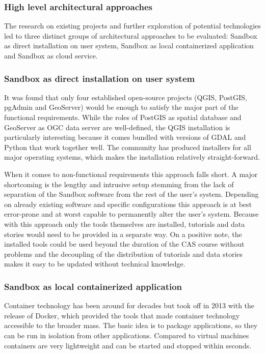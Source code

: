 \documentclass[11pt, a4paper, oneside, parskip=full-]{scrartcl}
\begin{document}
\subsubsection{High level architectural approaches}
The research on existing projects and further exploration of potential
technologies led to three distinct groups of architectural approaches to be
evaluated: Sandbox as direct installation on user system, Sandbox as local
containerized application and Sandbox as cloud service.

\subsubsection*{Sandbox as direct installation on user system}
It was found that only four established open-source projects (QGIS\cite{qgis},
PostGIS\cite{postgis}, pgAdmin\cite{pgadmin} and GeoServer\cite{geoserver})
would be enough to satisfy the major part of the functional requirements. While
the roles of PostGIS as spatial database and GeoServer as OGC data server are
well-defined, the QGIS installation is particularly interesting because it comes
bundled with versions of GDAL and Python that work together well. The community
has produced installers for all major operating systems, which makes the
installation relatively straight-forward.

When it comes to non-functional requirements this approach falls short. A major
shortcoming is the lengthy and intrusive setup stemming from the lack of
separation of the Sandbox software from the rest of the user's system. Depending
on already existing software and specific configurations this approach is at
best error-prone and at worst capable to permanently alter the user's system.
Because with this approach only the tools themselves are installed, tutorials
and data stories would need to be provided in a separate way. On a positive
note, the installed tools could be used beyond the duration of the CAS course
without problems and the decoupling of the distribution of tutorials and data
stories makes it easy to be updated without technical knowledge.

\subsubsection*{Sandbox as local containerized application}
Container technology has been around for decades but took off in 2013 with the
release of Docker, which provided the tools that made container technology
accessible to the broader mass. The basic idea is to package applications, so
they can be run in isolation from other applications. Compared to virtual
machines containers are very lightweight and can be started and stopped within
seconds.
\end{document}
